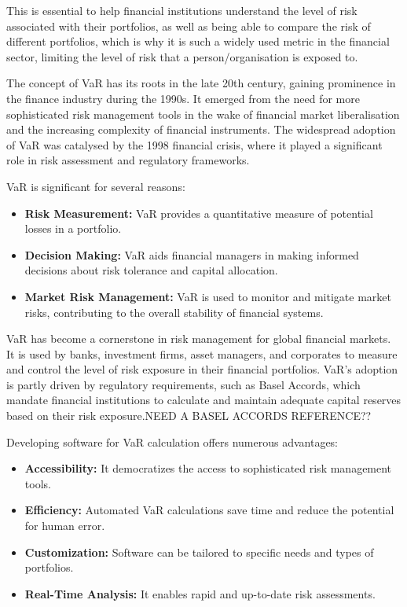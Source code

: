 \documentclass{article}
\begin{document}
This is essential to help financial institutions understand the level of risk associated with their portfolios, as well as being able to compare the risk of different portfolios, which is why it is such a widely used metric in the financial sector, limiting the level of risk that a person/organisation is exposed to.\\\vspace{0.3cm}

The concept of VaR has its roots in the late 20th century, gaining prominence in the finance industry during the 1990s. It emerged from the need for more sophisticated risk management tools in the wake of financial market liberalisation and the increasing complexity of financial instruments. The widespread adoption of VaR was catalysed by the 1998 financial crisis, where it played a significant role in risk assessment and regulatory frameworks.\\\vspace{0.3cm}


VaR is significant for several reasons:
\begin{itemize}
    \item \textbf{Risk Measurement:} VaR provides a quantitative measure of potential losses in a portfolio.
    \item \textbf{Decision Making:} VaR aids financial managers in making informed decisions about risk tolerance and capital allocation.
    \item \textbf{Market Risk Management:} VaR is used to monitor and mitigate market risks, contributing to the overall stability of financial systems.
\end{itemize}

VaR has become a cornerstone in risk management for global financial markets. It is used by banks, investment firms, asset managers, and corporates to measure and control the level of risk exposure in their financial portfolios. VaR's adoption is partly driven by regulatory requirements, such as Basel Accords, which mandate financial institutions to calculate and maintain adequate capital reserves based on their risk exposure.NEED A BASEL ACCORDS REFERENCE??\\\vspace{0.3cm} 


Developing software for VaR calculation offers numerous advantages:
\begin{itemize}
    \item \textbf{Accessibility:} It democratizes the access to sophisticated risk management tools.
    \item \textbf{Efficiency:} Automated VaR calculations save time and reduce the potential for human error.
    \item \textbf{Customization:} Software can be tailored to specific needs and types of portfolios.
    \item \textbf{Real-Time Analysis:} It enables rapid and up-to-date risk assessments.
\end{itemize}
\end{document}
